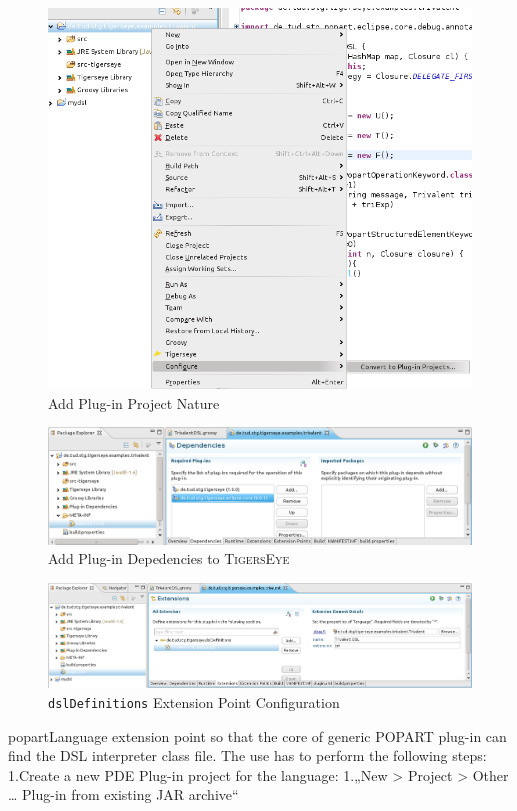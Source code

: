 \documentclass[article,colorback,accentcolor=tud4c]{tudreport}
\newcommand\tiger{%
  \textsc{TigersEye}
}
\begin{document}
  	\begin{figure}
	  \centering
	  \includegraphics[scale=.5,keepaspectratio=true]{./pics/example_deploy_converttoplugin.png}
	  \caption{Add Plug-in Project Nature}\label{fig:example_deploy_converttoplugin}
	\end{figure}
	 
	\begin{figure}
	  \centering
	  \includegraphics[scale=.5,keepaspectratio=true]{./pics/example_deploy_addplugindependencies.png}
	  \caption{Add Plug-in Depedencies to \tiger}\label{fig:example_deploy_addplugindependencies}
	\end{figure}
	
		\begin{figure}
	  \centering
	  \includegraphics[scale=.5,keepaspectratio=true]{./pics/example_deploy_extensionpoint.png}
	  \caption{\texttt{dslDefinitions} Extension Point Configuration}\label{fig:example_deploy_extensionpoint}
	\end{figure}

  
  popartLanguage extension point so that the core of
generic POPART plug-in can find the DSL interpreter class file.
The use has to perform the following steps:
1.Create a new PDE Plug-in project for the language:
1.„New > Project > Other … Plug-in from existing JAR archive“

	

  \listoftables
  \listoffigures{}
\end{document}

